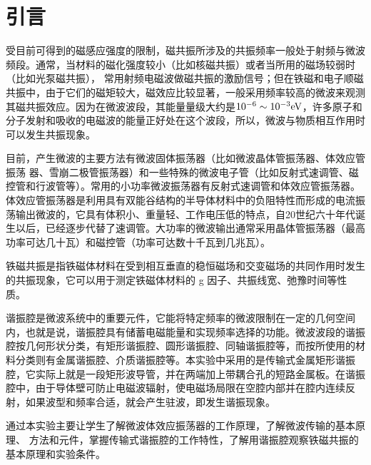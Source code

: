 \documentclass[a4paper]{article}
\begin{document}
\begin{center}
\tableofcontents\label{c}
\end{center}
\newpage

\section{引言} \label{overview}%
受目前可得到的磁感应强度的限制，磁共振所涉及的共振频率一般处于射频与微波频段。通常，当材料的磁化强度较小（比如核磁共振）或者当所用的磁场较弱时（比如光泵磁共振），
常用射频电磁波做磁共振的激励信号；但在铁磁和电子顺磁共振中，由于它们的磁矩较大，磁效应比较显著，一般采用频率较高的微波来观测其磁共振效应。因为在微波波段，其能量量级大约是$10^{-6}\sim 10^{-3}\rm eV$，许多原子和分子发射和吸收的电磁波的能量正好处在这个波段，所以，微波与物质相互作用时可以发生共振现象。

目前，产生微波的主要方法有微波固体振荡器（比如微波晶体管振荡器、体效应管振荡
器、雪崩二极管振荡器）和一些特殊的微波电子管（比如反射式速调管、磁控管和行波管等）。常用的小功率微波振荡器有反射式速调管和体效应管振荡器。体效应管振荡器是利用具有双能谷结构的半导体材料中的负阻特性而形成的电流振荡输出微波的，它具有体积小、重量轻、工作电压低的特点，自20世纪六十年代诞生以后，已经逐步代替了速调管。大功率的微波输出通常采用晶体管振荡器（最高功率可达几十瓦）和磁控管（功率可达数十千瓦到几兆瓦）。

铁磁共振是指铁磁体材料在受到相互垂直的稳恒磁场和交变磁场的共同作用时发生的共振现象，它可以用于测定铁磁体材料的 g 因子、共振线宽、弛豫时间等性质。

谐振腔是微波系统中的重要元件，它能将特定频率的微波限制在一定的几何空间内，也就是说，谐振腔具有储蓄电磁能量和实现频率选择的功能。微波波段的谐振腔按几何形状分类，有矩形谐振腔、圆形谐振腔、同轴谐振腔等，而按所使用的材料分类则有金属谐振腔、介质谐振腔等。本实验中采用的是传输式金属矩形谐振腔，它实际上就是一段矩形波导管，并在两端加上带耦合孔的短路金属板。在谐振腔中，由于导体壁可防止电磁波辐射，使电磁场局限在空腔内部并在腔内连续反射，如果波型和频率合适，就会产生驻波，即发生谐振现象。

通过本实验主要让学生了解微波体效应振荡器的工作原理，了解微波传输的基本原理、
方法和元件，掌握传输式谐振腔的工作特性，了解用谐振腔观察铁磁共振的基本原理和实验条件。

\newpage
\end{document}
